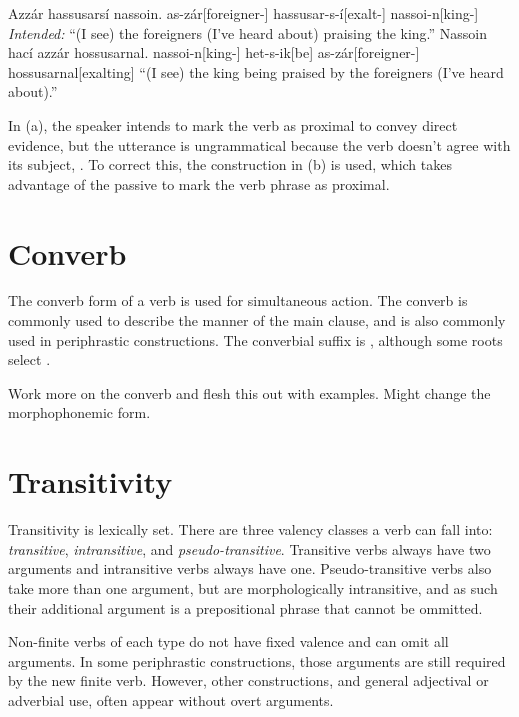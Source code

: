 \begin{gloss*}
	\a \ljudge{*} \begingl
		\glpreamble Azzár hassusarsí nassoin.\endpreamble 
			as-zár[foreigner-]
			hassusar-s-í[exalt-]
			nassoi-n[king-]
		\glft \textit{Intended:} “(I see) the foreigners (I've heard about) praising the king.”
	\endgl
	\a \begingl
		\glpreamble Nassoin hací azzár hossusarnal.\endpreamble
			nassoi-n[king-]
			het-s-ik[be]
			as-zár[foreigner-]
			hossusarnal[exalting]
		\glft “(I see) the king being praised by the foreigners (I've heard about).”
	\endgl
\end{gloss*}

In (\lastx a), the speaker intends to mark the verb as proximal to convey direct evidence, but the utterance is ungrammatical because the verb doesn't agree with its subject, . To correct this, the construction in (\lastx b) is used, which takes advantage of the passive to mark the verb phrase as proximal.

\section{Converb}
The converb form of a verb is used for simultaneous action. The converb is commonly used to describe the manner of the main clause, and is also commonly used in periphrastic constructions. The converbial suffix is , although some roots select .

\begin{kaobox}[frametitle=\sc todo:]
	Work more on the converb and flesh this out with examples. Might change the morphophonemic form.
\end{kaobox}

\section{Transitivity}
Transitivity is lexically set. There are three valency classes a verb can fall into: \emph{transitive}, \emph{intransitive}, and \emph{pseudo-transitive}. Transitive verbs always have two arguments and intransitive verbs always have one. Pseudo-transitive verbs also take more than one argument, but are morphologically intransitive, and as such their additional argument is a prepositional phrase that cannot be ommitted. 

Non-finite verbs of each type do not have fixed valence and can omit all arguments. In some periphrastic constructions, those arguments are still required by the new finite verb. However, other constructions, and general adjectival or adverbial use, often appear without overt arguments.

